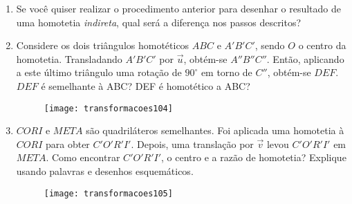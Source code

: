 \begin{enumerate}
\item Se você quiser realizar o procedimento anterior para desenhar o resultado de uma homotetia \textit{indireta}, qual será a diferença nos passos descritos? 

\item Considere os dois triângulos homotéticos $ABC$ e $A'B'C'$, sendo $O$ o centro da homotetia. Transladando $A'B'C'$ por $\overrightarrow{u}$, obtém-se $A''B''C''$. Então, aplicando a este último triângulo uma rotação de $90^{\circ}$ em torno de $C''$, obtém-se $DEF$. $DEF$ é semelhante à ABC? DEF é homotético a ABC?

\begin{figure}[H]
\centering

\texttt{[image: transformacoes104]}
\end{figure}

\item $CORI$ e $META$ são quadriláteros semelhantes. Foi aplicada uma homotetia à $CORI$ para obter $C'O'R'I'$. Depois, uma translação por $\overrightarrow{v}$ levou $C'O'R'I'$ em $META$. Como encontrar $C'O'R'I'$, o centro e a razão de homotetia? Explique usando palavras e desenhos esquemáticos. 

\begin{figure}[H]
\centering

\texttt{[image: transformacoes105]}
\end{figure}
\end{enumerate}

